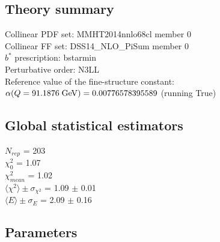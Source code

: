 \documentclass[
]{article}
\begin{document}
\hypertarget{theory-summary}{%
\subsection{Theory summary}\label{theory-summary}}

Collinear PDF set: MMHT2014nnlo68cl member 0\\
Collinear FF set: DSS14\_NLO\_PiSum member 0\\
\(b^*\) prescription: bstarmin\\
Perturbative order: N3LL\\
Reference value of the fine-structure constant:
\(\alpha(Q = 91.1876\;{\rm GeV}) = 0.00776578395589\) (running True)

\hypertarget{global-statistical-estimators}{%
\subsection{Global statistical
estimators}\label{global-statistical-estimators}}

\(N_{rep}\) = 203\\
\(\chi_{0}^2\) = 1.07\\
\(\chi_{mean}^2\) = 1.02\\
\(\langle\chi^2\rangle \pm \sigma_{\chi^2}\) = 1.09 \(\pm\) 0.01\\
\(\langle E \rangle \pm \sigma_{E}\) = 2.09 \(\pm\) 0.16

\hypertarget{parameters}{%
\subsection{Parameters}\label{parameters}}
\end{document}

